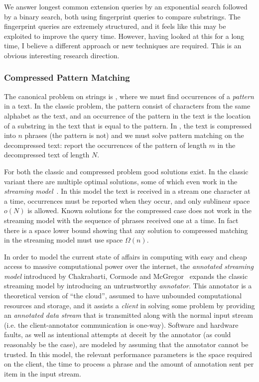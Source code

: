 We answer longest common extension queries by an exponential search followed by a binary search, both using fingerprint queries to compare substrings. The fingerprint queries are extremely structured, and it feels like this may be exploited to improve the query time. However, having looked at this for a long time, I believe a different approach or new techniques are required. This is an obvious interesting research direction.


\clearpage
\subsubsection{Compressed Pattern Matching}
The canonical problem on strings is , where we must find occurrences of a \emph{pattern} in a text. In the classic problem, the pattern consist of characters from the same alphabet as the text, and an occurrence of the pattern in the text is the location of a substring in the text that is equal to the pattern.
In , the text is compressed into $n$ phrases (the pattern is not) and we must solve pattern matching on the decompressed text: report the occurrences of the pattern of length $m$ in the decompressed text of length $N$. 

For both the classic and compressed problem good solutions exist. In the classic variant there are multiple optimal solutions, some of which even work in the \emph{streaming model}~\cite{munro1980selection, flajolet1985probabilistic, alon1999space}. In this model the text is received in a stream one character at a time, occurrences must be reported when they occur, and only sublinear space $o(N)$ is allowed. 
Known solutions for the compressed case does not work in the streaming model with the sequence of phrases received one at a time. In fact there is a space lower bound showing that any solution to compressed matching in the streaming model must use space $\Omega(n)$. 

In order to model the current state of affairs in computing with easy and cheap access to massive computational power over the internet, the \emph{annotated streaming model} introduced by Chakrabarti, Cormode and McGregor~\cite{chakrabarti2009annotations, chakrabarti2014annotations} expands the classic streaming model by introducing an untrustworthy \emph{annotator}. 
This annotator is a theoretical version of ``the cloud'', assumed to have unbounded computational resources and storage, and it assists a \emph{client} in solving some problem by providing an \emph{annotated data stream} that is transmitted along with the normal input stream (i.e. the client-annotator communication is one-way). 
Software and hardware faults, as well as intentional attempts at deceit by the annotator (as could reasonably be the case), are modeled by assuming that the annotator cannot be trusted.
In this model, the relevant performance parameters is the space required on the client, the time to process a phrase and the amount of annotation sent per item in the input stream.


